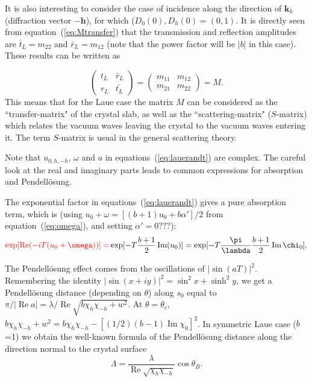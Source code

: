 \documentclass[preprint]{iucr}              %
\newcommand{\inred}[1]{{\color{red}#1}}
\begin{document}
It is also interesting to consider the case of incidence along the direction of $\textbf{k}_h$ (diffraction vector $-\textbf{h}$), for which ($D_0(0), D_h(0)=(0,1)$. It is directly seen from equation~(\ref{eq:Mtransfer}) that the transmission and reflection amplitudes are $\bar{t}_L=m_{22}$ and $\bar{r}_L=m_{12}$ (note that the power factor will be $|b|$ in this case). These results can be written as

\begin{equation}\label{eq:MtransferLaue}
    \begin{pmatrix}
    t_L & \bar{r}_L\\
    r_L & \bar{t_L}
    \end{pmatrix}
    =
    \begin{pmatrix}
    m_{11} & m_{12}\\
    m_{21} & m_{22}
    \end{pmatrix}
    = M.
\end{equation}
This means that for the Laue case the matrix $M$ can be considered as the ``transfer-matrix" of the crystal slab, as well as the ``scattering-matrix" ($S$-matrix) which relates the vacuum waves leaving the crystal to the vacuum waves entering it. The term $S$-matrix is usual in the general scattering theory.  

Note that $u_{0,h,-h}$, $\omega$ and $a$ in equations~(\ref{eq:lauerandt}) are complex. The careful look at the real and imaginary parts leads to common expressions for absorption and Pendell\"osung. 

The exponential factor in equations~(\ref{eq:lauerandt}) gives a pure absorption term, which is (using $u_0 +\omega=[(b+1)u_0+b\alpha']/2$ from equation~({\ref{eq:omega}}), 
\inred{and setting $\alpha'=0 ???$}):  
\begin{subequations}
\begin{align}
   \inred{ \exp[\operatorname{Re}(-iT(u_0+\omega))] = }
    \exp[-T \frac{b+1}{2}\operatorname{Im}(u_0)] =  
    \exp[-T \frac{\pi}{\lambda}\frac{b+1}{2} \operatorname{Im} \chi_0].
\end{align}
\end{subequations}

The Pendell\"osung effect comes from the oscillations of $|\sin(aT)|^2$. Remembering the identity $|\sin(x+iy)|^2=\sin^2x + \sinh^2 y$, we get a Pendell\"osung distance (depending on $\theta$) along $s_0$ equal to  
$\pi / |\operatorname{Re} a|=\lambda / \operatorname{Re}\sqrt{b\chi_h\chi_{-h} + w^2}$.
At $\theta=\theta_c$, $b \chi_h \chi_{-h}+w^2=b \chi_h \chi_{-h} - [(1/2)(b-1)\operatorname{Im}\chi_0]^2$. In symmetric Laue case ($b$=1) we obtain the well-known formula of the Pendell\"osung distance along the direction normal to the crystal surface
\begin{equation}\label{eq:Pendellosung}
    \Lambda =\frac{\lambda}{\operatorname{Re}\sqrt{\chi_h\chi_{-h}}} \cos\theta_B.
\end{equation}
\end{document}
